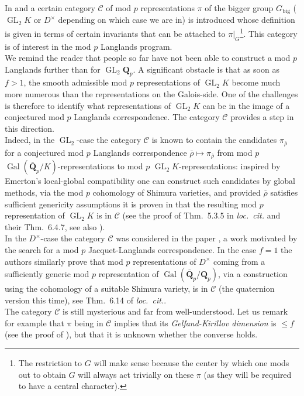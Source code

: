 \documentclass[11pt, oneside]{article}
\DeclareMathOperator{\GL}{GL}
\DeclareMathOperator{\Gal}{Gal}
\theoremstyle{definition}
\begin{document}
	In \cite{BHHMSConjs} and \cite{hu2024modprepresentationsquaternion} a certain category $\mathcal C$ of mod $p$ representations $\pi$ of the bigger group $G_\text{big}$ ($\GL_2K$ or $D^\times$ depending on which case we are in) is introduced whose definition is given in terms of certain invariants that can be attached to $\pi|_G$\footnote{The restriction to $G$ will make sense because the center by which one mods out to obtain $G$ will always act trivially on these $\pi$ (as they will be required to have a central character).}. This category is of interest in the mod $p$ Langlands program.\\ 
	We remind the reader that people so far have not been able to construct a mod $p$ Langlands further than for $\GL_2\mathbf Q_p$. A significant obstacle is that as soon as $f>1$, the smooth admissible mod $p$ representations of $\GL_2K$ become much more numerous than the representations on the Galois-side. One of the challenges is therefore to identify what representations of $\GL_2K$ can be in the image of a conjectured mod $p$ Langlands correspondence. The category $\mathcal C$ provides a step in this direction.\\ 
	Indeed, in the $\GL_2$-case the category $\mathcal C$ is known to contain the candidates $\pi_{\overline\rho}$ for a conjectured mod $p$ Langlands correspondence $\overline\rho\mapsto\pi_{\overline\rho}$ from mod $p$ $\Gal(\overline{\mathbf Q}_p/K)$-representations to mod $p$ $\GL_2K$-representations: inspired by Emerton's local-global compatibility one can construct such candidates by global methods, via the mod $p$ cohomology of Shimura varieties, and provided $\overline\rho$ satisfies sufficient genericity assumptions it is proven in \cite{BHHMS1} that the resulting mod $p$ representation of $\GL_2K$ is in $\mathcal C$ (see the proof of Thm.~5.3.5 in \emph{loc.~cit.} and their Thm.~6.4.7, see also \cite[Thm.~5.1]{wang2023modpcohomologyoperatornamegl2}).\\
	In the $D^\times$-case the category $\mathcal C$ was considered in the paper \cite{hu2024modprepresentationsquaternion}, a work motivated by the search for a mod $p$ Jacquet-Langlands correspondence. In the case $f=1$ the authors similarly prove that mod $p$ representations of $D^\times$ coming from a sufficiently generic mod $p$ representation of $\Gal(\overline{\mathbf Q}_p/\mathbf Q_p)$, via a construction using the cohomology of a suitable Shimura variety, is in $\mathcal C$ (the quaternion version this time), see Thm.~6.14 of \emph{loc.~cit.}.\\
	The category $\mathcal C$ is still mysterious and far from well-understood. Let us remark for example that $\pi$ being in $\mathcal C$ implies that its \emph{Gelfand-Kirillov dimension} is $\leq f$ (see the proof of \cite[Thm.~5.3.5]{BHHMS1}), but that it is unknown whether the converse holds.\\
	
\end{document}
